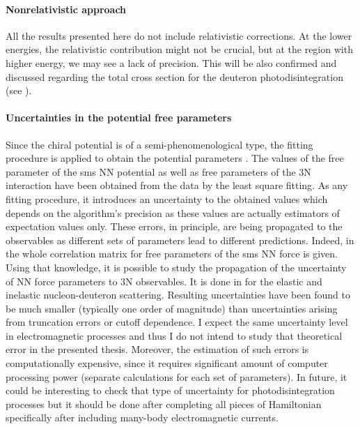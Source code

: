     \paragraph{Nonrelativistic approach}
    All the results presented here do not include relativistic corrections.
    At the lower energies, the relativistic contribution might not be crucial,
    but at the region with higher energy, we may see a lack of precision.
    This will be also confirmed and discussed regarding the total cross section
    for the deuteron photodisintegration (see ).
    
    \paragraph{Uncertainties in the potential free parameters}
    Since the chiral potential is of a semi-phenomenological type, the fitting procedure is applied
    to obtain the potential parameters \cite{reinkrebs2018}. 
    The values of the free parameter of the \gls{sms} NN potential as well as free
    parameters of the  3N  interaction have been obtained from the data by the least square fitting.
    As any fitting procedure, it introduces an uncertainty to the obtained values which depends on the algorithm's precision as
    these values are actually estimators of expectation values only.
    These errors, in principle, are being propagated to the observables as different sets of parameters
    lead to different predictions.
    Indeed, in \cite{reinkrebs2018} the whole correlation matrix for free parameters of the  \gls{sms} NN
    force is given. Using that knowledge, it is possible to study the propagation of the uncertainty of NN
    force parameters to 3N observables. It is done in \cite{skibincki_prc_2018, Volkotrub_2020} for the
    elastic and inelastic nucleon-deuteron scattering.
    Resulting uncertainties have been found to be much smaller (typically one order of magnitude)
    than uncertainties arising from truncation errors or cutoff dependence.
    I expect  the same uncertainty level in electromagnetic processes and thus I do not
    intend to study that theoretical error in the presented thesis.
    Moreover, the estimation of such errors is computationally expensive, since it requires 
    significant amount of computer processing power (separate calculations for each set of parameters).
    In future, it could be interesting to check that type of uncertainty for photodisintegration
    processes but it should be done after completing all pieces of Hamiltonian 
    specifically after including many-body electromagnetic currents.

